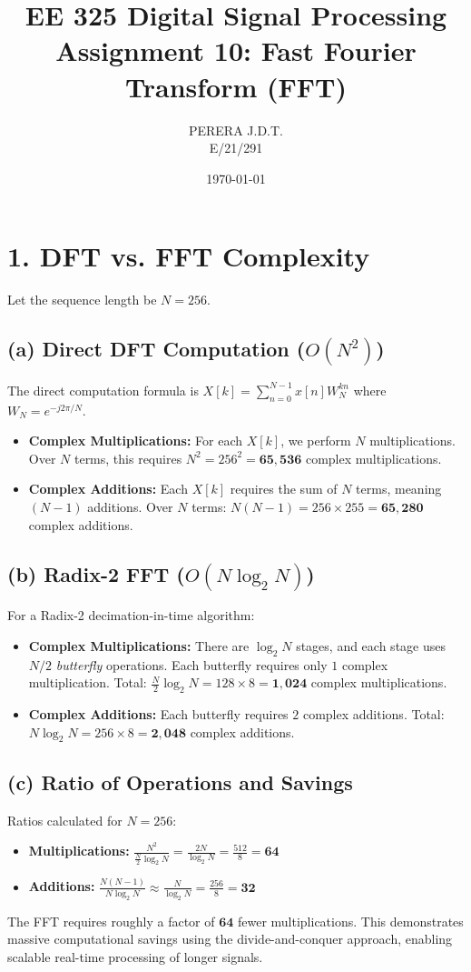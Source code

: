\documentclass[11pt, a4paper]{article}
\title{EE 325 Digital Signal Processing \\ Assignment 10: Fast Fourier Transform (FFT)}
\author{PERERA J.D.T. \\ E/21/291}
\date{\today}
\begin{document}
\maketitle

\section{1. DFT vs. FFT Complexity}
Let the sequence length be $N = 256$.

\subsection{(a) Direct DFT Computation ($O(N^2)$)}
The direct computation formula is $X[k] = \sum_{n=0}^{N-1} x[n] W_N^{kn}$ where $W_N = e^{-j 2\pi / N}$.
\begin{itemize}
    \item \textbf{Complex Multiplications:} For each $X[k]$, we perform $N$ multiplications. Over $N$ terms, this requires $N^2 = 256^2 = \mathbf{65,536}$ complex multiplications.
    \item \textbf{Complex Additions:} Each $X[k]$ requires the sum of $N$ terms, meaning $(N-1)$ additions. Over $N$ terms: $N(N-1) = 256 \times 255 = \mathbf{65,280}$ complex additions.
\end{itemize}

\subsection{(b) Radix-2 FFT ($O(N \log_2 N)$)}
For a Radix-2 decimation-in-time algorithm:
\begin{itemize}
    \item \textbf{Complex Multiplications:} There are $\log_2 N$ stages, and each stage uses $N/2$ \textit{butterfly} operations. Each butterfly requires only $1$ complex multiplication. Total: $\frac{N}{2} \log_2 N = 128 \times 8 = \mathbf{1,024}$ complex multiplications.
    \item \textbf{Complex Additions:} Each butterfly requires $2$ complex additions. Total: $N \log_2 N = 256 \times 8 = \mathbf{2,048}$ complex additions.
\end{itemize}

\subsection{(c) Ratio of Operations and Savings}
Ratios calculated for $N=256$:
\begin{itemize}
    \item \textbf{Multiplications:} $\frac{N^2}{\frac{N}{2} \log_2 N} = \frac{2N}{\log_2 N} = \frac{512}{8} = \mathbf{64}$
    \item \textbf{Additions:} $\frac{N(N-1)}{N \log_2 N} \approx \frac{N}{\log_2 N} = \frac{256}{8} = \mathbf{32}$
\end{itemize}
The FFT requires roughly a factor of $\mathbf{64}$ fewer multiplications. This demonstrates massive computational savings using the divide-and-conquer approach, enabling scalable real-time processing of longer signals.
\end{document}
